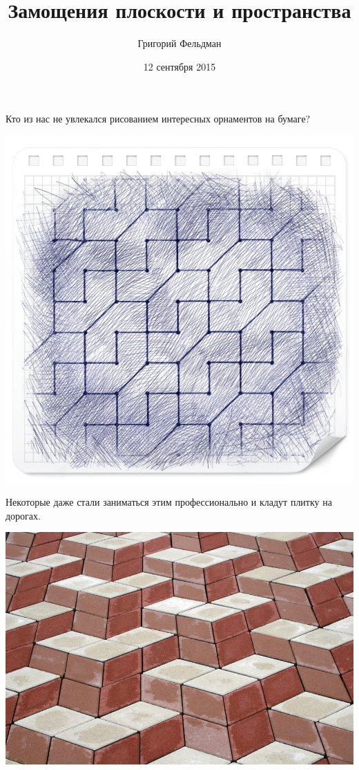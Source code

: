 \documentclass{beamer}
\title{Замощения плоскости и пространства}
\institute[ФТЛ]{Физтех-лицей \\ \medskip \slshape  feldman@wowmath.ru}
\author{Григорий Фельдман}
\date{12 сентября 2015}
\begin{document}
\begin{frame}
\titlepage
\end{frame}


\begin{frame}


%
Кто из нас не увлекался рисованием интересных орнаментов на бумаге? 

\centerline{\includegraphics[width=.7\textwidth]{tess_pen.jpg}}

\end{frame}


\begin{frame}
Некоторые даже стали заниматься этим профессионально и кладут плитку на дорогах.

\begin{center}
\includegraphics[width=.7\textwidth]{trotuar.jpg}
\end{center}

\end{frame}
\end{document}
